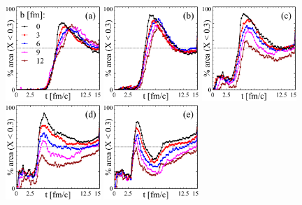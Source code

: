 \begin{figure}
  \includegraphics[width = 0.32\textwidth]{plots/thermalization_urqmd/plot_x_area_percentages_E5.pdf}
  \includegraphics[width = 0.32\textwidth]{plots/thermalization_urqmd/plot_x_area_percentages_E10.pdf}
  \includegraphics[width = 0.32\textwidth]{plots/thermalization_urqmd/plot_x_area_percentages_E20.pdf}\\
  \includegraphics[width = 0.32\textwidth]{plots/thermalization_urqmd/plot_x_area_percentages_E40.pdf} 
  \includegraphics[width = 0.32\textwidth]{plots/thermalization_urqmd/plot_x_area_percentages_E80.pdf}

\end{figure}
